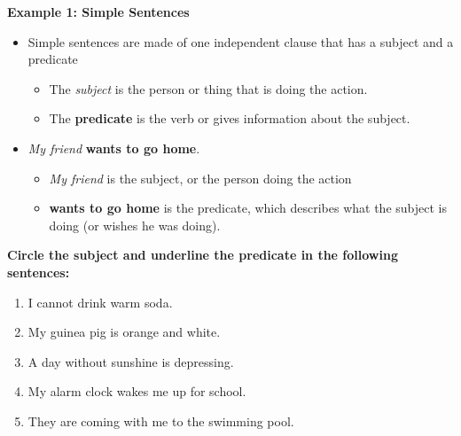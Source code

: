 \documentclass[12pt]{article}
\begin{document}
\begin{tcolorbox}[colframe=black!60, colback=white, 
coltitle=black, colbacktitle=black!15, fonttitle=\bfseries\Large, 
title=Examples, halign title=center, left=10pt, right=10pt, top=10pt, bottom=15pt]
\textbf{Example 1: Simple Sentences}
\begin{itemize}
    \item Simple sentences are made of one independent clause that has a subject and a predicate
    \begin{itemize}
        \item The \textit{subject} is the person or thing that is doing the action.
        \item The \textbf{predicate} is the verb or gives information about the subject.
    \end{itemize}
\item \textit{My friend} \textbf{wants to go home}. 
\begin{itemize}
    \item \textit{My friend} is the subject, or the person doing the action
    \item \textbf{wants to go home} is the predicate, which describes what the subject is doing (or wishes he was doing).
\end{itemize}
\end{itemize}

     \end{tcolorbox}

\vspace{1em}

\begin{tcolorbox}[colframe=black!60, colback=white, 
coltitle=black, colbacktitle=black!15, fonttitle=\bfseries\Large, 
title=Guided Practice, halign title=center, left=10pt, right=10pt, top=10pt, bottom=15pt]
\textbf{Circle the subject and underline the predicate in the following sentences:}
\begin{enumerate}[itemsep=1em] %
    \item I cannot drink warm soda.
    \item My guinea pig is orange and white.
    \item A day without sunshine is depressing.
    \item My alarm clock wakes me up for school.
    \item They are coming with me to the swimming pool.
\end{enumerate}
\end{tcolorbox}
\end{document}

